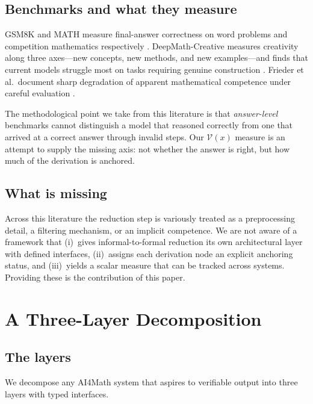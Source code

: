 \documentclass[11pt,a4paper]{article}
\theoremstyle{definition}
\theoremstyle{plain}
\theoremstyle{remark}
\newcommand{\V}{\mathcal{V}}           %
\begin{document}
\subsection{Benchmarks and what they measure}

GSM8K and MATH measure final-answer correctness on word problems and
competition mathematics respectively \cite{cobbe2021training,hendrycks2021measuring}.
DeepMath-Creative measures creativity along three axes---new concepts, new
methods, and new examples---and finds that current models struggle most on
tasks requiring genuine construction \cite{chen2025deepmath}. Frieder et al.\
document sharp degradation of apparent mathematical competence under careful
evaluation \cite{frieder2023mathematical}.

The methodological point we take from this literature is that
\emph{answer-level} benchmarks cannot distinguish a model that reasoned
correctly from one that arrived at a correct answer through invalid steps. Our
$\V(x)$ measure is an attempt to supply the missing axis: not whether the
answer is right, but how much of the derivation is anchored.

\subsection{What is missing}

Across this literature the reduction step is variously treated as a
preprocessing detail, a filtering mechanism, or an implicit competence. We are
not aware of a framework that (i)~gives informal-to-formal reduction its own
architectural layer with defined interfaces, (ii)~assigns each derivation node
an explicit anchoring status, and (iii)~yields a scalar measure that can be
tracked across systems. Providing these is the contribution of this paper.

\section{A Three-Layer Decomposition}
\label{sec:layers}

\subsection{The layers}

We decompose any AI4Math system that aspires to verifiable output into three
layers with typed interfaces.
\end{document}
